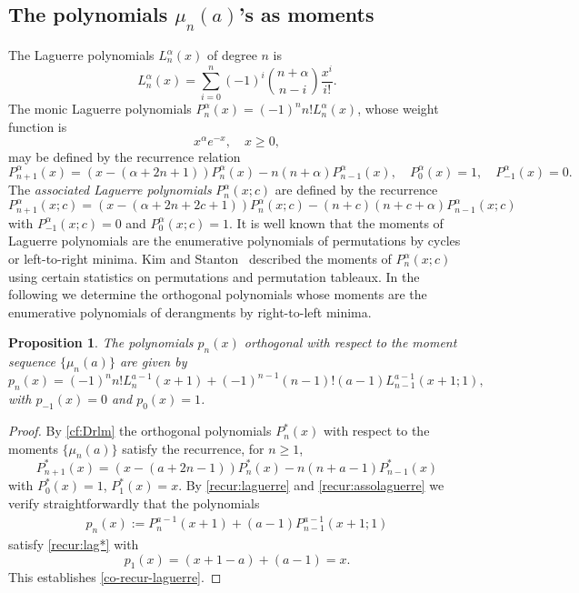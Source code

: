 \documentclass[12pt,reqno]{amsart}
\numberwithin{equation}{section}
\newcounter{num}
\newtheorem{prop}{Proposition}
\begin{document}
\subsection{The polynomials $\mu_n(a)$'s as moments}
The Laguerre polynomials $L^{\alpha}_n(x)$ of degree $n$ is 
$$
L^{\alpha}_n(x)=\sum_{i=0}^n (-1)^i{n+\alpha\choose n-i}\frac{x^i}{i!}.
$$
The monic Laguerre polynomials $P^{\alpha}_n(x)=(-1)^n n!L_{n}^{\alpha}(x)$, whose weight function is $$x^\alpha e^{-x}, \quad x\geq 0,$$ 
may be  defined by 
the recurrence relation
\begin{equation}\label{recur:laguerre}
	P^{\alpha}_{n+1}(x)=(x-(\alpha+2n+1))
	P^{\alpha}_{n}(x)-n(n+\alpha)P^{\alpha}_{n-1}(x), \quad P^{\alpha}_{0}(x)=1,\quad P^{\alpha}_{-1}(x)=0.
\end{equation}
The \emph{associated Laguerre polynomials} 
$P^{\alpha}_{n}(x;c)$ are defined by the recurrence
\begin{equation}\label{recur:assolaguerre}
	P^{\alpha}_{n+1}(x;c)=(x-(\alpha+2n+2c+1))
	P^{\alpha}_{n}(x;c)-
	(n+c)(n+c+\alpha)P^{\alpha}_{n-1}(x;c)
\end{equation}
with $P^{\alpha}_{-1}(x;c)=0$ and 
$P^{\alpha}_{0}(x;c)=1$.
It is well known that the moments of Laguerre polynomials are the enumerative polynomials of permutations  by cycles or left-to-right minima. 
Kim and Stanton~\cite{KS15} described 
the moments of  $P^{\alpha}_{n}(x;c)$ using certain statistics on permutations and permutation tableaux. In the following we determine 
the orthogonal polynomials  whose 
moments are the enumerative polynomials  of derangments 
by right-to-left minima.
\begin{prop} 
The polynomials $p_n(x)$ orthogonal   with respect to the moment sequence 
	$\{\mu_n(a)\}$ are given  by 
	\begin{equation}\label{co-recur-laguerre}
		p_n(x)=(-1)^n n!L_n^{a-1}(x+1)+ (-1)^{n-1}(n-1)!(a-1)L_{n-1}^{a-1}(x+1;1),
	\end{equation}
	with $p_{-1}(x)=0$ and $p_{0}(x)=1$.
\end{prop}
\begin{proof}
	By \eqref{cf:Drlm} the orthogonal polynomials $P^*_n(x)$ with respect to the moments 
	$\{\mu_n(a)\}$ satisfy the recurrence, for $n\geq 1$,
	\begin{equation}\label{recur:lag*}
		P^*_{n+1}(x)=(x-(a+2n-1))P^*_{n}(x)-n(n+a-1)P^*_{n-1}(x) 
	\end{equation}
	with  $P^*_0(x)=1$, $P^*_1(x)=x$.
	By \eqref{recur:laguerre} and 
	\eqref{recur:assolaguerre} we verify straightforwardly that 
	the polynomials 
	\begin{align}\label{eq:poly}
	p_n(x):=
	P^{a-1}_{n}(x+1)+(a-1)P^{a-1}_{n-1}(x+1;1)
\end{align}
	 satisfy \eqref{recur:lag*} 
with  
	$$
	p_1(x)=(x+1-a)+(a-1)=x.
	$$
	This establishes \eqref{co-recur-laguerre}.
\end{proof}
\end{document}
